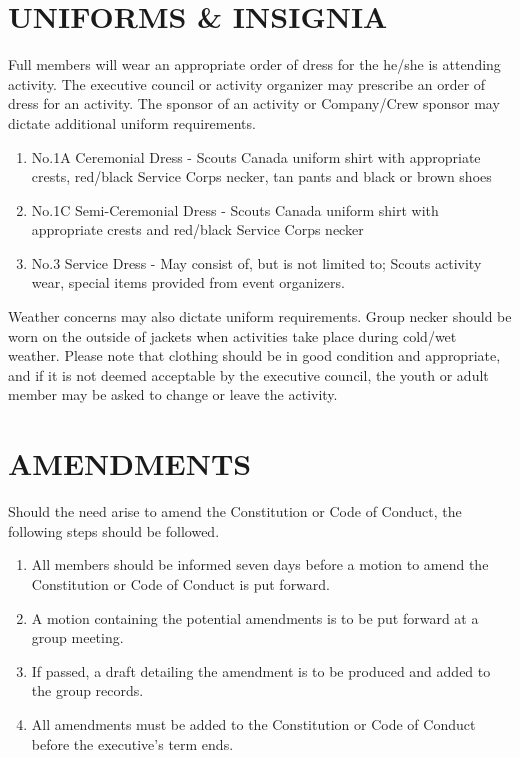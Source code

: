 \documentclass{Service_Corps_Document}
\begin{document}
\section{UNIFORMS \& INSIGNIA}
Full members will wear an appropriate order of dress for the he/she is attending activity. The executive council or activity organizer may prescribe an order of dress for an activity. The sponsor of an activity or Company/Crew sponsor may dictate additional uniform requirements.
\begin{enumerate}
	\item No.1A Ceremonial Dress - Scouts Canada uniform shirt with appropriate crests, red/black Service Corps necker, tan pants and black or brown shoes
	\item No.1C Semi-Ceremonial Dress - Scouts Canada uniform shirt with appropriate crests and red/black Service Corps necker
	\item No.3 Service Dress - May consist of, but is not limited to; Scouts activity wear, special items provided from event organizers.
\end{enumerate}
Weather concerns may also dictate uniform requirements. Group necker should be worn on the outside of jackets when activities take place during cold/wet weather. Please note that clothing should be in good condition and appropriate, and if it is not deemed acceptable by the executive council, the youth or adult member may be asked to change or leave the activity.
\section{AMENDMENTS}
Should the need arise to amend the Constitution or Code of Conduct, the following steps should be followed. 
\begin{enumerate}
	\item All members should be informed seven days before a motion to amend the Constitution or Code of Conduct is put forward.
	\item A motion containing the potential amendments is to be put forward at a group meeting.
	\item If passed, a draft detailing the amendment is to be produced and added to the group records.
	\item All amendments must be added to the Constitution or Code of Conduct before the executive's term ends.
\end{enumerate}
\end{document}
